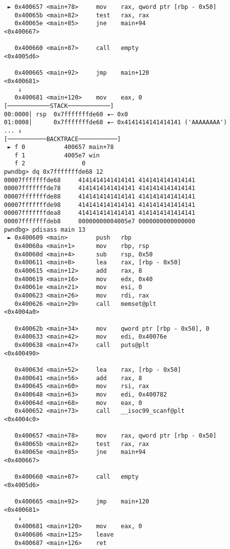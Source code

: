 \documentclass{article}
\begin{document}
\begin{lstlisting}
 ► 0x400657 <main+78>     mov    rax, qword ptr [rbp - 0x50]
   0x40065b <main+82>     test   rax, rax
   0x40065e <main+85>     jne    main+94                       <0x400667>
 
   0x400660 <main+87>     call   empty                         <0x4005d6>
 
   0x400665 <main+92>     jmp    main+120                      <0x400681>
    ↓
   0x400681 <main+120>    mov    eax, 0
[────────────STACK────────────]
00:0000│ rsp  0x7fffffffde60 ◂— 0x0
01:0008│      0x7fffffffde68 ◂— 0x4141414141414141 ('AAAAAAAA')
... ↓
[───────────BACKTRACE───────────]
 ► f 0           400657 main+78
   f 1           4005e7 win
   f 2                0
pwndbg> dq 0x7fffffffde68 12
00007fffffffde68     4141414141414141 4141414141414141
00007fffffffde78     4141414141414141 4141414141414141
00007fffffffde88     4141414141414141 4141414141414141
00007fffffffde98     4141414141414141 4141414141414141
00007fffffffdea8     4141414141414141 4141414141414141
00007fffffffdeb8     00000000004005e7 0000000000000000
pwndbg> pdisass main 13
 ► 0x400609 <main>        push   rbp
   0x40060a <main+1>      mov    rbp, rsp
   0x40060d <main+4>      sub    rsp, 0x50
   0x400611 <main+8>      lea    rax, [rbp - 0x50]
   0x400615 <main+12>     add    rax, 8
   0x400619 <main+16>     mov    edx, 0x40
   0x40061e <main+21>     mov    esi, 0
   0x400623 <main+26>     mov    rdi, rax
   0x400626 <main+29>     call   memset@plt                    <0x4004a0>
 
   0x40062b <main+34>     mov    qword ptr [rbp - 0x50], 0
   0x400633 <main+42>     mov    edi, 0x40076e
   0x400638 <main+47>     call   puts@plt                      <0x400490>
 
   0x40063d <main+52>     lea    rax, [rbp - 0x50]
   0x400641 <main+56>     add    rax, 8
   0x400645 <main+60>     mov    rsi, rax
   0x400648 <main+63>     mov    edi, 0x400782
   0x40064d <main+68>     mov    eax, 0
   0x400652 <main+73>     call   __isoc99_scanf@plt            <0x4004c0>
 
   0x400657 <main+78>     mov    rax, qword ptr [rbp - 0x50]
   0x40065b <main+82>     test   rax, rax
   0x40065e <main+85>     jne    main+94                       <0x400667>
 
   0x400660 <main+87>     call   empty                         <0x4005d6>
 
   0x400665 <main+92>     jmp    main+120                      <0x400681>
    ↓
   0x400681 <main+120>    mov    eax, 0
   0x400686 <main+125>    leave  
   0x400687 <main+126>    ret    
 

\end{lstlisting}
\end{document}
